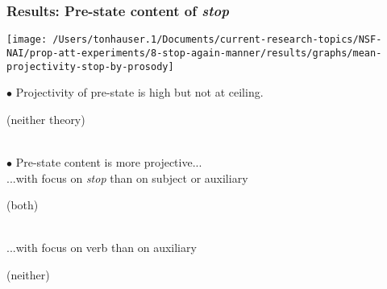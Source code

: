 \documentclass[pdf,xcolor=table,envcountsect,handout]{beamer}
\begin{document}
\begin{frame}
\frametitle{Results: Pre-state content of {\em stop}}


\hfill \begin{footnotesize}  \end{footnotesize}
\hspace*{1cm} \texttt{[image: /Users/tonhauser.1/Documents/current-research-topics/NSF-NAI/prop-att-experiments/8-stop-again-manner/results/graphs/mean-projectivity-stop-by-prosody]}

\medskip
\pause

$\bullet$ Projectivity of pre-state is high but not at ceiling. \begin{footnotesize}(neither theory)\end{footnotesize}
\\[.1cm]
\pause
$\bullet$ Pre-state content is more projective...
\\ \hspace*{.7cm} ...with focus on {\em stop} than on subject or auxiliary  \begin{footnotesize} (both) \end{footnotesize}
\pause
\\ \hspace*{.7cm} ...with focus on verb than on auxiliary \begin{footnotesize} (neither) \end{footnotesize}

\end{frame}
\end{document}

